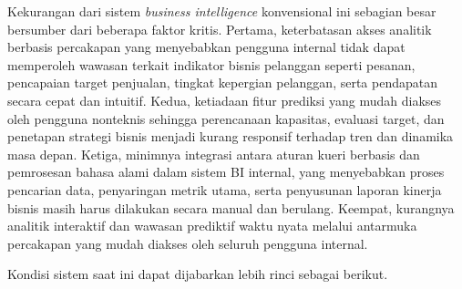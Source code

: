 Kekurangan dari sistem \textit{business intelligence} konvensional ini sebagian besar bersumber dari beberapa faktor kritis. Pertama, keterbatasan akses analitik berbasis percakapan yang menyebabkan pengguna internal tidak dapat memperoleh wawasan terkait indikator bisnis pelanggan seperti pesanan, pencapaian target penjualan, tingkat kepergian pelanggan, serta pendapatan secara cepat dan intuitif. Kedua, ketiadaan fitur prediksi yang mudah diakses oleh pengguna nonteknis sehingga perencanaan kapasitas, evaluasi target, dan penetapan strategi bisnis menjadi kurang responsif terhadap tren dan dinamika masa depan. Ketiga, minimnya integrasi antara aturan kueri berbasis dan pemrosesan bahasa alami dalam sistem BI internal, yang menyebabkan proses pencarian data, penyaringan metrik utama, serta penyusunan laporan kinerja bisnis masih harus dilakukan secara manual dan berulang. Keempat, kurangnya analitik interaktif dan wawasan prediktif waktu nyata melalui antarmuka percakapan yang mudah diakses oleh seluruh pengguna internal.

Kondisi sistem saat ini dapat dijabarkan lebih rinci sebagai berikut.

